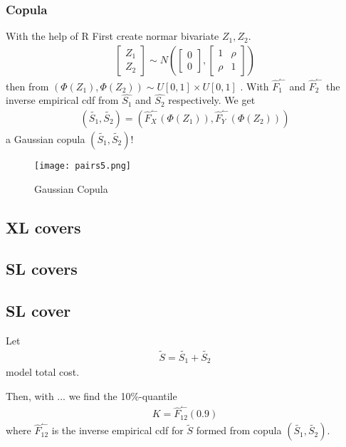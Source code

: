 \documentclass[11pt]{article}
\begin{document}
\subsubsection*{Copula}
With the help of R 
First create normar bivariate $Z_1,Z_2$.
\begin{align} \label{eq:bi1}
	 \begin{bmatrix} Z_1 \\ Z_2\end{bmatrix} \sim N\left(\begin{bmatrix} 0 \\ 0\end{bmatrix},\begin{bmatrix} 1&\rho \\ \rho&1\end{bmatrix}\right)
\end{align}
then from   $\left(\Phi(Z_1),\Phi(Z_2)\right) \sim  U[0,1] \times U[0,1]$ .
With $\hat{F}_1^\leftharpoonup$ and $\hat{F}_2^\leftharpoonup$ the inverse empirical cdf from $\hat{S_1}$ and $\hat{S_2}$ respectively.
We get
\begin{align} \label{eq:bi3}
	  \left(\tilde{S_1},\tilde{S_2}\right) = \left(\hat{F}_X^\leftharpoonup(\Phi(Z_1)),\hat{F}_Y^\leftharpoonup(\Phi(Z_2))\right) 
\end{align}
a Gaussian copula $ \left(\tilde{S_1},\tilde{S_2}\right)$!

 \begin{figure}[H]
 \center
  \texttt{[image: pairs5.png]}
  \caption{Gaussian Copula}
  \label{fig:samplefig5}
\end{figure}

\subsection*{XL covers}

\subsection*{SL covers}

\subsection*{SL cover}
Let
\begin{align*} 
	\tilde{S}= \tilde{S_1} + \tilde{S_2}
\end{align*}
model total cost.

Then, with ... we find the 10\%-quantile
\begin{align*} 
	K = \hat{F}_{12}^\leftharpoonup(0.9)
\end{align*}
where $\hat{F}_{12}^\leftharpoonup$ is the inverse empirical cdf for $\tilde{S}$  formed from copula $(\tilde{S_1}, \tilde{S_2})$.
\end{document}
